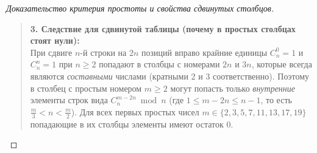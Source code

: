 \begin{proof}[Доказательство критерия простоты и свойства сдвинутых столбцов]
\begin{quote}
        \textbf{3. Следствие для сдвинутой таблицы (почему в простых 
        столбцах стоят нули):}\\
        При сдвиге $n$-й строки на $2n$ позиций вправо крайние единицы 
        $C_n^0 = 1$ и $C_n^n = 1$ при $n \ge 2$ попадают в столбцы с 
        номерами $2n$ и $3n$, которые всегда являются \emph{составными} 
        числами (кратными $2$ и $3$ соответственно). Поэтому в столбец с 
        простым номером $m \ge 2$ могут попасть только \emph{внутренние} 
        элементы строк вида $C_n^{m-2n} \bmod n$ (где $1 \le m - 2n \le n - 1$, 
        то есть $\frac{m}{3} < n < \frac{m}{2}$). Для всех первых простых 
        чисел $m \in \{2, 3, 5, 7, 11, 13, 17, 19\}$ попадающие в их 
        столбцы элементы имеют остаток $0$.
    \end{quote}
\end{proof}